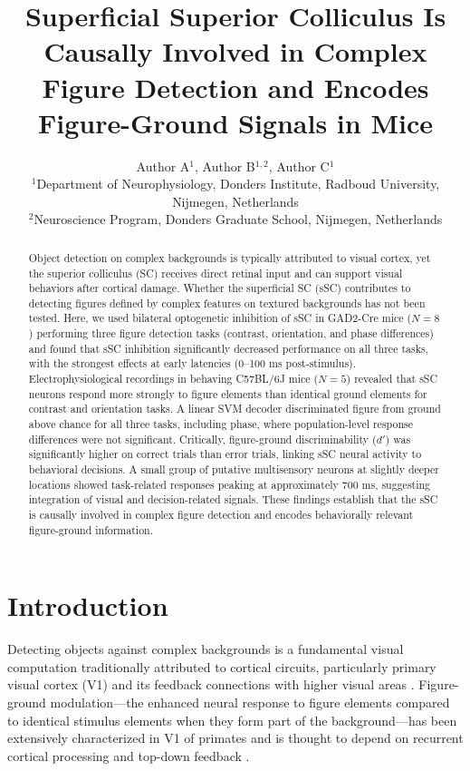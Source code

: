\documentclass[12pt]{article}
\title{Superficial Superior Colliculus Is Causally Involved in Complex Figure Detection and Encodes Figure-Ground Signals in Mice}
\author{Author A$^{1}$, Author B$^{1,2}$, Author C$^{1}$ \\
\small $^{1}$Department of Neurophysiology, Donders Institute, Radboud University, Nijmegen, Netherlands \\
\small $^{2}$Neuroscience Program, Donders Graduate School, Nijmegen, Netherlands}
\date{}
\begin{document}
\maketitle

\begin{abstract}
Object detection on complex backgrounds is typically attributed to visual cortex, yet the superior colliculus (SC) receives direct retinal input and can support visual behaviors after cortical damage. Whether the superficial SC (sSC) contributes to detecting figures defined by complex features on textured backgrounds has not been tested. Here, we used bilateral optogenetic inhibition of sSC in GAD2-Cre mice ($N = 8$) performing three figure detection tasks (contrast, orientation, and phase differences) and found that sSC inhibition significantly decreased performance on all three tasks, with the strongest effects at early latencies (0--100 ms post-stimulus). Electrophysiological recordings in behaving C57BL/6J mice ($N = 5$) revealed that sSC neurons respond more strongly to figure elements than identical ground elements for contrast and orientation tasks. A linear SVM decoder discriminated figure from ground above chance for all three tasks, including phase, where population-level response differences were not significant. Critically, figure-ground discriminability ($d'$) was significantly higher on correct trials than error trials, linking sSC neural activity to behavioral decisions. A small group of putative multisensory neurons at slightly deeper locations showed task-related responses peaking at approximately 700 ms, suggesting integration of visual and decision-related signals. These findings establish that the sSC is causally involved in complex figure detection and encodes behaviorally relevant figure-ground information.
\end{abstract}

\section{Introduction}

Detecting objects against complex backgrounds is a fundamental visual computation traditionally attributed to cortical circuits, particularly primary visual cortex (V1) and its feedback connections with higher visual areas \citep{lamme1995figure}. Figure-ground modulation---the enhanced neural response to figure elements compared to identical stimulus elements when they form part of the background---has been extensively characterized in V1 of primates and is thought to depend on recurrent cortical processing and top-down feedback \citep{lamme1995figure}.
\end{document}
